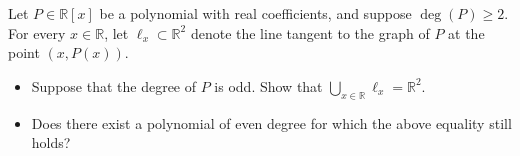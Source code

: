 Let \(P \in \mathbb{R}[x]\) be a polynomial with real coefficients, and suppose \(\deg(P) \ge 2\). For every \(x \in \mathbb{R}\), let \(\ell_x \subset \mathbb{R}^2\) denote the line tangent to the graph of \(P\) at the point \((x, P(x))\).
\begin{itemize}
    \item[(a)] Suppose that the degree of \(P\) is odd. Show that \(\displaystyle\bigcup_{x \in \mathbb{R}} \ell_x = \mathbb{R}^2\).
    \item[(b)] Does there exist a polynomial of even degree for which the above equality still holds?
\end{itemize}

